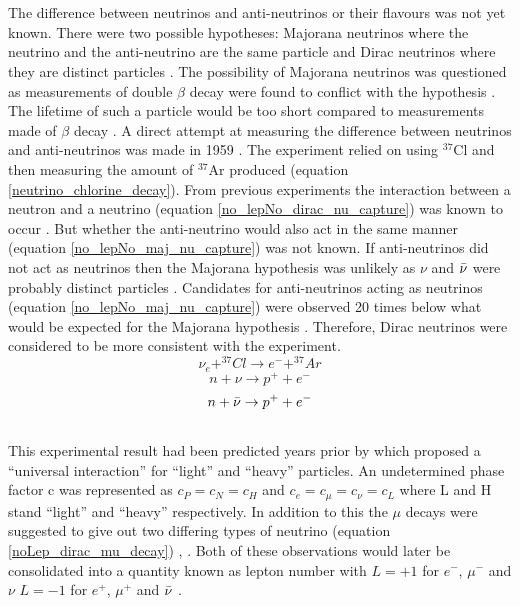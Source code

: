 \\\\The difference between neutrinos and anti-neutrinos or their flavours was not yet known. There were two possible hypotheses: Majorana neutrinos where the neutrino and the anti-neutrino are the same particle and Dirac neutrinos where they are distinct particles \cite{griffiths2008book} \cite{griffiths2008neutrino1.5} \cite{cowan1957test}. The possibility of Majorana neutrinos was questioned as measurements of double $\beta$ decay were found to conflict with the hypothesis \cite{cowan1957test}. The lifetime of such a particle would be too short compared to measurements made of $\beta$ decay \cite{cowan1957test}. A direct attempt at measuring the difference between neutrinos and anti-neutrinos was made in 1959 \cite{davis1959attempt}. The experiment relied on using $^{37}$Cl and then measuring the amount of $^{37}$Ar produced (equation \ref{neutrino_chlorine_decay}). From previous experiments the interaction between a neutron and a neutrino (equation \ref{no_lepNo_dirac_nu_capture}) was known to occur \cite{Cowan1956Confirmation}. But whether the anti-neutrino would also act in the same manner (equation \ref{no_lepNo_maj_nu_capture}) was not known. If anti-neutrinos did not act as neutrinos then the Majorana hypothesis was unlikely as $\nu$ and $\Bar{\nu}$ were probably distinct particles \cite{griffiths2008book} \cite{griffiths2008neutrino1.5} \cite{davis1959attempt}. Candidates for anti-neutrinos acting as neutrinos (equation \ref{no_lepNo_maj_nu_capture}) were observed 20 times below what would be expected for the Majorana hypothesis \cite{davis1959attempt}. Therefore, Dirac neutrinos were considered to be more consistent with the experiment. 
\begin{equation}
    \nu_e + ^{37}Cl \rightarrow  e^- + ^{37}Ar
    \label{neutrino_chlorine_decay}
\end{equation}
\begin{equation}
    n + \nu \rightarrow p^+ + e^-
    \label{no_lepNo_dirac_nu_capture}
\end{equation}
\begin{equation}
    n + \Bar{\nu} \rightarrow p^+ + e^-
    \label{no_lepNo_maj_nu_capture}
\end{equation}
\\This experimental result had been predicted years prior by \cite{konopinski1953universal} which proposed a ``universal interaction'' for ``light'' and ``heavy'' particles. An undetermined phase factor c was represented as $c_P=c_N=c_H$ and $c_e=c_\mu=c_\nu=c_L$ where L and H stand ``light'' and ``heavy'' respectively. In addition to this the $\mu$ decays were suggested to give out two differing types of neutrino (equation \ref{noLep_dirac_mu_decay}) \cite{griffiths2008book} \cite{griffiths2008neutrino1.5}, \cite{konopinski1953universal}. Both of these observations would later be consolidated into a quantity known as lepton number with $L=+1$ for $e^-$, $\mu^-$ and $\nu$ $L=-1$ for $e^+$, $\mu^+$ and $\Bar{\nu}$ \cite{griffiths2008book}\cite{griffiths2008neutrino1.5}. 

